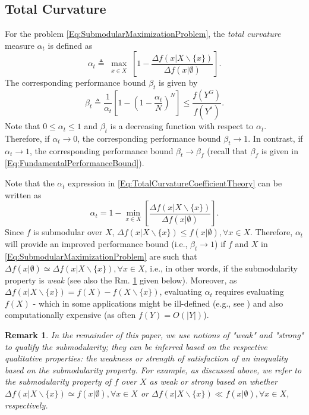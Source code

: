 \documentclass[conference]{IEEEtran}
\newtheorem{remark}{Remark}
\begin{document}
\subsection{Total Curvature \cite{Conforti1984}}
\label{SubSec:TotalCurvature}

For the problem \eqref{Eq:SubmodularMaximizationProblem}, the \emph{total curvature} measure $\alpha_t$ is defined as 
\begin{equation}\label{Eq:TotalCurvatureCoefficientTheory}
    \alpha_t \triangleq \max_{\substack{x \in X} }\left[1 - \frac{\Delta f(x \vert X \backslash \{x\})}{\Delta f(x \vert \emptyset)}\right].
\end{equation}
The corresponding performance bound $\beta_t$ is given by
\begin{equation}\label{Eq:TotalCurvatureBoundTheory}
    \beta_t \triangleq \frac{1}{\alpha_t} \left[ 1 - \left( 1 -\frac{\alpha_t}{N} \right)^N \right] \leq \frac{f(Y^G)}{f(Y^*)}.
\end{equation}
Note that $0 \leq \alpha_t \leq 1$ and $\beta_t$ is a decreasing function with respect to $\alpha_t$. Therefore, if $\alpha_t\rightarrow 0$, the corresponding performance bound $\beta_t\rightarrow 1$. In contrast, if $\alpha_t\rightarrow 1$, the corresponding performance bound $\beta_t\rightarrow\beta_f$ (recall that $\beta_f$ is given in \eqref{Eq:FundamentalPerformanceBound}).


Note that the $\alpha_t$ expression in \eqref{Eq:TotalCurvatureCoefficientTheory} can be written as
$$ 
    \alpha_t = 1 - \min_{x \in X}\left[\frac{\Delta f(x \vert X \backslash \{x\})}{\Delta f(x \vert \emptyset)}\right].
$$
Since $f$ is submodular over $X$, $\Delta f(x \vert X \backslash \{x\}) \leq f(x \vert \emptyset), \forall x \in X$. Therefore, $\alpha_t$ will provide an improved performance bound (i.e., $\beta_t \rightarrow 1$) if $f$ and $X$ in \eqref{Eq:SubmodularMaximizationProblem} are such that $\Delta f(x \vert \emptyset) \simeq \Delta f(x \vert X \backslash \{x\}), \forall x \in X$, i.e., in other words, if the submodularity property is \emph{weak} (see also the Rm. \ref{Rm:SubmodularityStrength} given below). Moreover, as $\Delta f(x \vert X \backslash \{x\}) = f(X) - f(X \backslash \{x\})$, evaluating $\alpha_t$ requires evaluating $f(X)$ - which in some applications might be ill-defined (e.g., see \cite{Sun2020}) and also computationally expensive (as often $f(Y)=O(\vert Y \vert)$). 

\begin{remark}\label{Rm:SubmodularityStrength}
In the remainder of this paper, we use notions of "weak" and "strong" to qualify the submodularity; they can be inferred based on the respective qualitative properties: the weakness or strength of satisfaction of an inequality based on the submodularity property. For example, as discussed above, we refer to the submodularity property of $f$ over $X$ as weak or strong based on whether $\Delta f(x \vert X \backslash \{x\}) \simeq f(x \vert \emptyset), \forall x \in X$ or 
$\Delta f(x \vert X \backslash \{x\}) \ll f(x \vert \emptyset), \forall x \in X$, respectively. 
\end{remark}
\end{document}
